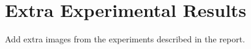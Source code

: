 \chapter{Extra Experimental Results}

Add extra images from the experiments described in the report.